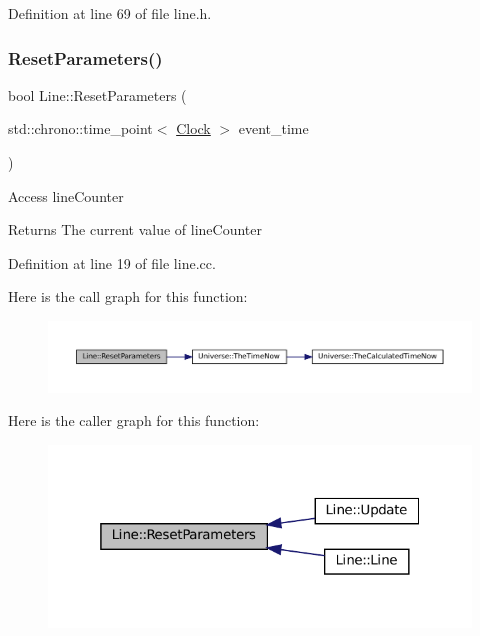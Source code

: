Definition at line 69 of file line.\+h.

\mbox{\label{class_line_af1756d1500ab0a5616313be6e213015a}} 
\subsubsection{\texorpdfstring{Reset\+Parameters()}{ResetParameters()}}
{\footnotesize\ttfamily bool Line\+::\+Reset\+Parameters (\begin{DoxyParamCaption}\item[{std\+::chrono\+::time\+\_\+point$<$ \mbox{\hyperlink{universe_8h_a0ef8d951d1ca5ab3cfaf7ab4c7a6fd80}{Clock}} $>$}]{event\+\_\+time }\end{DoxyParamCaption})}

Access line\+Counter \begin{DoxyReturn}{Returns}
The current value of line\+Counter 
\end{DoxyReturn}


Definition at line 19 of file line.\+cc.

Here is the call graph for this function\+:\nopagebreak
\begin{figure}[H]
\begin{center}
\leavevmode
\includegraphics[width=350pt]{class_line_af1756d1500ab0a5616313be6e213015a_cgraph}
\end{center}
\end{figure}
Here is the caller graph for this function\+:\nopagebreak
\begin{figure}[H]
\begin{center}
\leavevmode
\includegraphics[width=319pt]{class_line_af1756d1500ab0a5616313be6e213015a_icgraph}
\end{center}
\end{figure}
\mbox{\label{class_line_ab98abcf3c8546e266ae5bbea243d8b8d}} 
